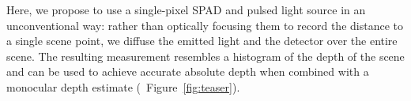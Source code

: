 
Here, we propose to use a single-pixel SPAD and pulsed light source in an unconventional way: rather than optically focusing them to record the distance to a single scene point, we diffuse the emitted light and the detector over the entire scene. The resulting measurement resembles a histogram of the depth of the scene and can be used to achieve accurate absolute depth when combined with a monocular depth estimate (\cf~Figure~\ref{fig:teaser}).




